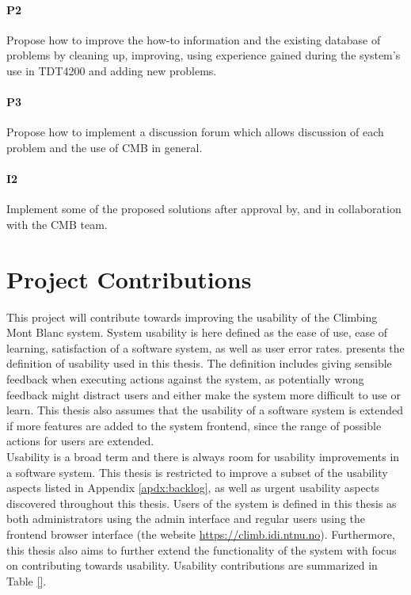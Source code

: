 \paragraph*{P2}  Propose how to improve the how-to information and the existing database of problems by cleaning up, improving, using experience gained during the system's use in TDT4200 \cite{TDT4200} and adding new problems.

\paragraph*{P3} Propose how to implement a discussion forum which allows discussion of each problem and the use of CMB in general.

\paragraph*{I2} Implement some of the proposed solutions after approval by, and in collaboration with the CMB team. \\

\section{Project Contributions}
\label{sec:cont}
This project will contribute towards improving the usability of the Climbing Mont Blanc system. System usability is here defined as the ease of use, ease of learning, satisfaction of a software system, as well as user error rates.  presents the definition of usability used in this thesis. The definition includes giving sensible feedback when executing actions against the system, as potentially wrong feedback might distract users and either make the system more difficult to use or learn. This thesis also assumes that the usability of a software system is extended if more features are added to the system frontend, since the range of possible actions for users are extended. \\

Usability is a broad term and there is always room for usability improvements in a software system. This thesis is restricted to improve a subset of the usability aspects listed in Appendix \ref{apdx:backlog}, as well as urgent usability aspects discovered throughout this thesis. Users of the system is defined in this thesis as both administrators using the admin interface and regular users using the frontend browser interface (the website \url{https://climb.idi.ntnu.no}). Furthermore, this thesis also aims to further extend the functionality of the system with focus on contributing towards usability. Usability contributions are summarized in Table \ref{}. \\

